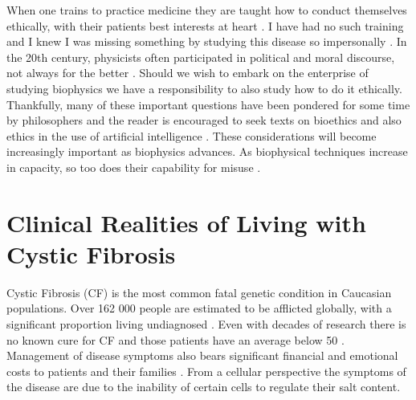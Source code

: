 When one trains to practice medicine they are taught how to conduct themselves ethically, with their patients best interests at heart \cite{hajar2017}. I have had no such training and I knew I was missing something by studying this disease so impersonally \cite{foucault1994}. In the 20th century, physicists often participated in political and moral discourse, not always for the better \cite{frank1993, gottfried1999, global2009, rhodes1986, aaronson2008, berger2016, vonneumann_britanica}. Should we wish to embark on the enterprise of studying biophysics we have a responsibility to also study how to do it ethically. Thankfully, many of these important questions have been pondered for some time by philosophers and the reader is encouraged to seek texts on bioethics and also ethics in the use of artificial intelligence \cite{buchanan2000, taneri2011, genome_editting_guildelines_2017, muller2021, bostrom2014}. These considerations will become increasingly important as biophysics advances. As biophysical techniques increase in capacity, so too does their capability for misuse \cite{mallapaty2022, urbina2022}. 





\section{Clinical Realities of Living with Cystic Fibrosis}
Cystic Fibrosis (CF) is the most common fatal genetic condition in Caucasian populations. Over 162 000 people are estimated to be afflicted globally, with a significant proportion living undiagnosed \cite{hammoudeh2021,guo2022}. Even with decades of research there is no known cure for CF and those patients have an average below 50 \cite{mcbennett2022}. Management of disease symptoms also bears significant financial and emotional costs to patients and their families \cite{vangool2013, page2022}. From a cellular perspective the symptoms of the disease are due to the inability of certain cells to regulate their salt content. 


